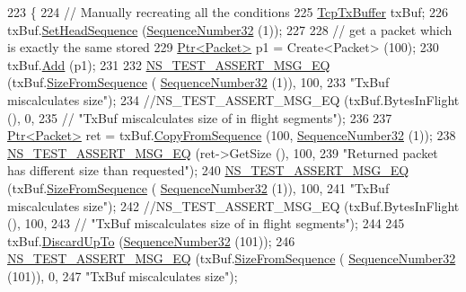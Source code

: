 \begin{DoxyCode}
223 \{
224   \textcolor{comment}{// Manually recreating all the conditions}
225   \hyperlink{classns3_1_1TcpTxBuffer}{TcpTxBuffer} txBuf;
226   txBuf.\hyperlink{classns3_1_1TcpTxBuffer_ae9d25292f14d338abe26a2657e103921}{SetHeadSequence} (\hyperlink{classns3_1_1SequenceNumber}{SequenceNumber32} (1));
227 
228   \textcolor{comment}{// get a packet which is exactly the same stored}
229   \hyperlink{classns3_1_1Ptr}{Ptr<Packet>} p1 = Create<Packet> (100);
230   txBuf.\hyperlink{classns3_1_1TcpTxBuffer_a275d96f2c58333c9e7c5fe0f1fa152e1}{Add} (p1);
231 
232   \hyperlink{group__testing_ga2a9d78cffb3db8e867c35fff0b698cf5}{NS\_TEST\_ASSERT\_MSG\_EQ} (txBuf.\hyperlink{classns3_1_1TcpTxBuffer_a6e44c34fdb2c14dcc11dbbe86d8b328a}{SizeFromSequence} (
      \hyperlink{classns3_1_1SequenceNumber}{SequenceNumber32} (1)), 100,
233                          \textcolor{stringliteral}{"TxBuf miscalculates size"});
234   \textcolor{comment}{//NS\_TEST\_ASSERT\_MSG\_EQ (txBuf.BytesInFlight (), 0,}
235   \textcolor{comment}{//                       "TxBuf miscalculates size of in flight segments");}
236 
237   \hyperlink{classns3_1_1Ptr}{Ptr<Packet>} ret = txBuf.\hyperlink{classns3_1_1TcpTxBuffer_a5eb9c889cfad2cd11a5ccf996c506fd3}{CopyFromSequence} (100, 
      \hyperlink{classns3_1_1SequenceNumber}{SequenceNumber32} (1));
238   \hyperlink{group__testing_ga2a9d78cffb3db8e867c35fff0b698cf5}{NS\_TEST\_ASSERT\_MSG\_EQ} (ret->GetSize (), 100,
239                          \textcolor{stringliteral}{"Returned packet has different size than requested"});
240   \hyperlink{group__testing_ga2a9d78cffb3db8e867c35fff0b698cf5}{NS\_TEST\_ASSERT\_MSG\_EQ} (txBuf.\hyperlink{classns3_1_1TcpTxBuffer_a6e44c34fdb2c14dcc11dbbe86d8b328a}{SizeFromSequence} (
      \hyperlink{classns3_1_1SequenceNumber}{SequenceNumber32} (1)), 100,
241                          \textcolor{stringliteral}{"TxBuf miscalculates size"});
242   \textcolor{comment}{//NS\_TEST\_ASSERT\_MSG\_EQ (txBuf.BytesInFlight (), 100,}
243   \textcolor{comment}{//                       "TxBuf miscalculates size of in flight segments");}
244 
245   txBuf.\hyperlink{classns3_1_1TcpTxBuffer_ad145a6de0122b3400fcbbff030d2acea}{DiscardUpTo} (\hyperlink{classns3_1_1SequenceNumber}{SequenceNumber32} (101));
246   \hyperlink{group__testing_ga2a9d78cffb3db8e867c35fff0b698cf5}{NS\_TEST\_ASSERT\_MSG\_EQ} (txBuf.\hyperlink{classns3_1_1TcpTxBuffer_a6e44c34fdb2c14dcc11dbbe86d8b328a}{SizeFromSequence} (
      \hyperlink{classns3_1_1SequenceNumber}{SequenceNumber32} (101)), 0,
247                          \textcolor{stringliteral}{"TxBuf miscalculates size"});

\end{DoxyCode}
